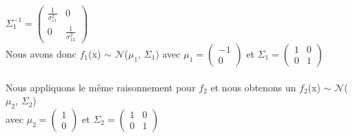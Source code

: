 \documentclass[a4paper, 10pt]{article}
\begin{document}
$\Sigma_{1}^{-1} =
\begin{pmatrix}
\frac{1}{\sigma_{11}^{2}} & 0 \\
0 & \frac{1}{\sigma_{12}^{2}}
\end{pmatrix}$\\
Nous avons donc \textit{$f_{1}$}(x) $\sim$ $\mathcal{N}$($\mu_{1}$, $\Sigma_{1}$) avec $\mu_{1} =
\begin{pmatrix}
-1 \\
0
\end{pmatrix}$
et $\Sigma_{1} =
\begin{pmatrix}
1 & 0 \\
0 & 1
\end{pmatrix}$\\ \\
Nous appliquons le même raisonnement pour \textit{$f_{2}$} et
nous obtenons un \textit{$f_{2}$}(x) $\sim$ $\mathcal{N}$($\mu_{2}$, $\Sigma_{2}$)\\avec $\mu_{2} =
\begin{pmatrix}
1 \\
0
\end{pmatrix}$
et $\Sigma_{2} =
\begin{pmatrix}
1 & 0 \\
0 & 1
\end{pmatrix}$
\newpage
\end{document}
